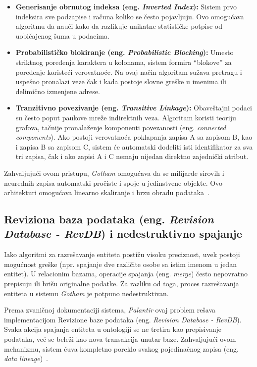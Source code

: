 ﻿\documentclass[12pt]{article}
\begin{document}
\begin{itemize}
    \item \textbf{Generisanje obrnutog indeksa (eng. \textit{Inverted Index}):} Sistem prvo indeksira sve podzapise i računa koliko se često pojavljuju.
    Ovo omogućava algoritmu da nauči kako da razlikuje unikatne statističke potpise od uobičajenog šuma u podacima.
    \item \textbf{Probabilističko blokiranje (eng. \textit{Probabilistic Blocking}):} Umesto striktnog poređenja karaktera u kolonama, sistem formira \enquote{blokove} za poređenje koristeći verovatnoće.
    Na ovaj način algoritam sužava pretragu i uspešno pronalazi veze čak i kada postoje slovne greške u imenima ili delimično izmenjene adrese.
    \item \textbf{Tranzitivno povezivanje (eng. \textit{Transitive Linkage}):} Obaveštajni podaci su često poput paukove mreže indirektnih veza.
    Algoritam koristi teoriju grafova, tačnije pronalaženje komponenti povezanosti (eng. \textit{connected components}).
    Ako postoji verovatnoća poklapanja zapisa A sa zapisom B, kao i zapisa B sa zapisom C, sistem će automatski dodeliti isti identifikator za sva tri zapisa, čak i ako zapisi A i C nemaju nijedan direktno zajednički atribut.
\end{itemize}

Zahvaljujući ovom pristupu, \textit{Gotham} omogućava da se milijarde sirovih i neurednih zapisa automatski pročiste i spoje u jedinstvene objekte.
Ovo arhitekturi omogućava linearno skaliranje i brzu obradu podataka~\cite{architecture2024}.

\subsection{Reviziona baza podataka (eng. \textit{Revision Database - RevDB}) i nedestruktivno spajanje}

Iako algoritmi za razrešavanje entiteta postižu visoku preciznost, uvek postoji mogućnost greške (npr. spajanje dve različite osobe sa istim imenom u jedan entitet).
U relacionim bazama, operacije spajanja (eng. \textit{merge}) često nepovratno prepisuju ili brišu originalne podatke.
Za razliku od toga, proces razrešavanja entiteta u sistemu \textit{Gotham} je potpuno nedestruktivan.

Prema zvaničnoj dokumentaciji sistema, \textit{Palantir} ovaj problem rešava implementacijom Revizione baze podataka (eng. \textit{Revision Database - RevDB}). Svaka akcija spajanja entiteta u ontologiji se ne tretira kao prepisivanje podataka, već se beleži kao nova transakcija unutar baze.
Zahvaljujući ovom mehanizmu, sistem čuva kompletno poreklo svakog pojedinačnog zapisa (eng. \textit{data lineage})~\cite{architecture2024}.
\end{document}
